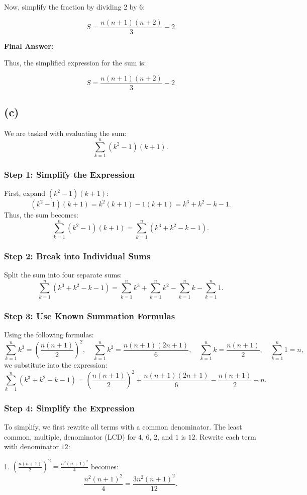 \documentclass{article}
\begin{document}
Now, simplify the fraction by dividing 2 by 6:

\[
S = \frac{n(n+1)(n+2)}{3} - 2
\]

\textbf{Final Answer:}

Thus, the simplified expression for the sum is:

\[
S = \frac{n(n+1)(n+2)}{3} - 2
\]
\subsection*{(c)}
We are tasked with evaluating the sum:
\[
\sum_{k=1}^n (k^2 - 1)(k + 1).
\]

\subsubsection*{Step 1: Simplify the Expression}
First, expand \((k^2 - 1)(k + 1)\):
\[
(k^2 - 1)(k + 1) = k^2(k + 1) - 1(k + 1) = k^3 + k^2 - k - 1.
\]
Thus, the sum becomes:
\[
\sum_{k=1}^n (k^2 - 1)(k + 1) = \sum_{k=1}^n (k^3 + k^2 - k - 1).
\]

\subsubsection*{Step 2: Break into Individual Sums}
Split the sum into four separate sums:
\[
\sum_{k=1}^n (k^3 + k^2 - k - 1) = \sum_{k=1}^n k^3 + \sum_{k=1}^n k^2 - \sum_{k=1}^n k - \sum_{k=1}^n 1.
\]

\subsubsection*{Step 3: Use Known Summation Formulas}
Using the following formulas:
\[
\sum_{k=1}^n k^3 = \left(\frac{n(n+1)}{2}\right)^2, \quad
\sum_{k=1}^n k^2 = \frac{n(n+1)(2n+1)}{6}, \quad
\sum_{k=1}^n k = \frac{n(n+1)}{2}, \quad
\sum_{k=1}^n 1 = n,
\]
we substitute into the expression:
\[
\sum_{k=1}^n (k^3 + k^2 - k - 1) = \left(\frac{n(n+1)}{2}\right)^2 + \frac{n(n+1)(2n+1)}{6} - \frac{n(n+1)}{2} - n.
\]

\subsubsection*{Step 4: Simplify the Expression}
To simplify, we first rewrite all terms with a common denominator. The least common, multiple, denominator (LCD) for \(4\), \(6\), \(2\), and \(1\) is \(12\). Rewrite each term with denominator \(12\):

1. \(\left(\frac{n(n+1)}{2}\right)^2 = \frac{n^2(n+1)^2}{4}\) becomes:
   \[
   \frac{n^2(n+1)^2}{4} = \frac{3n^2(n+1)^2}{12}.
   \]
\end{document}
